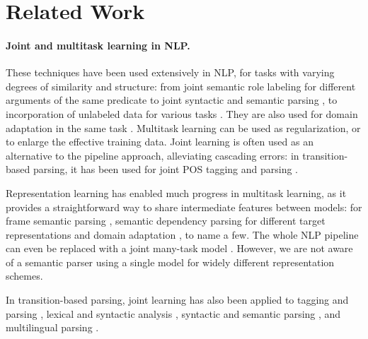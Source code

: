 \documentclass[11pt,a4paper]{article}
\begin{document}
\section{Related Work}\label{sec:related_work}


\paragraph{Joint and multitask learning in NLP.}

These techniques have been used extensively in NLP,
for tasks with varying degrees of similarity and structure:
from joint semantic role labeling for different arguments of the same predicate
\cite{toutanova2005joint} to
joint syntactic and semantic parsing \cite{henderson2013multilingual}, to
incorporation of unlabeled data for various tasks \cite{ando2005framework}.
They are also used for domain adaptation in the same task \cite{W06-1615,P07-1033}.
Multitask learning can be used as regularization, or to enlarge the effective training data.
Joint learning is often used as an alternative to the pipeline approach,
alleviating cascading errors:
in transition-based parsing, it has been used for joint POS tagging and parsing \cite{bohnet2012transition}.

Representation learning has enabled much progress in multitask learning,
as it provides a straightforward way to share intermediate features between models:
for frame semantic parsing \cite{swayamdipta2017frame},
semantic dependency parsing for different target representations \citet{P17-1186} 
and domain adaptation \cite{K17-1040}, to name a few.
The whole NLP pipeline can even be replaced with a joint many-task model
\cite[JMT; ][]{collobert2011natural,D17-1206}.
However, we are not aware of a semantic parser using a single model for
widely different representation schemes.

In transition-based parsing, joint learning has also been applied to
tagging and parsing \cite{Zhang2016StackpropagationIR},
lexical and syntactic analysis \cite{constant-nivre:2016:P16-1,more2016joint},
syntactic and semantic parsing \cite{swayamdipta-EtAl:2016:CoNLL},
and multilingual parsing \cite{Q16-1031,guo2016exploiting}.
\end{document}
